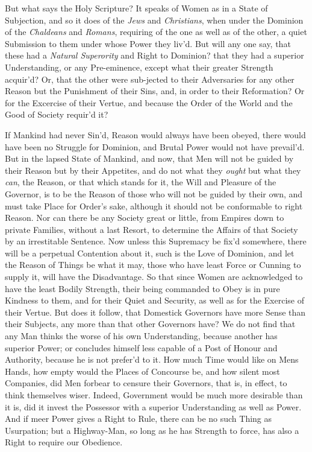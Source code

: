 But what says the Holy Scripture? It speaks of Women as in a State of
Subjection, and so it does of the \textit{Jews} and
\textit{Christians}, when under the Dominion of the \textit{Chaldeans}
and \textit{Romans}, requiring of the one as well as of the other, a
quiet Submission to them under whose Power they liv'd. But will any
one say, that these had a \textit{Natural Superority} and Right to
Dominion? that they had a superior Understanding, or any Pre-eminence,
except what their greater Strength acquir'd? Or, that the other were
sub-jected to their Adversaries for any other Reason but the
Punishment of their Sins, and, in order to their Reformation? Or for
the Excercise of their Vertue, and because the Order of the World and
the Good of Society requir'd it?

If Mankind had never Sin'd, Reason would always have been obeyed,
there would have been no Struggle for Dominion, and Brutal Power would
not have prevail'd. But in the lapsed State of Mankind, and now, that
Men will not be guided by their Reason but by their Appetites, and do
not what they \textit{ought} but what they \textit{can}, the Reason,
or that which stands for it, the Will and Pleasure of the Governor, is
to be the Reason of those who will not be guided by their own, and
must take Place for Order's sake, although it should not be
conformable to right Reason. Nor can there be any Society great or
little, from Empires down to private Families, without a last Resort,
to determine the Affairs of  that Society by an irrestitable
Sentence. Now unless this Supremacy be fix'd somewhere, there will be
a perpetual Contention about it, such is the Love of Dominion, and let
the Reason of Things be what it may, those who have least Force or
Cunning to supply it, will have the Disadvantage. So that since Women
are acknowledged to have the least Bodily Strength, their being
commanded to Obey is in pure Kindness to them, and for their Quiet and
Security, as well as for the Exercise of their Vertue. But does it
follow, that Domestick Governors have more Sense than their Subjects,
any more than that other Governors have? We do not find that any Man
thinks the worse of his own Understanding, because another has
superior Power; or concludes himself less capable of a Post of Honour
and Authority, because he is not prefer'd to it. How much Time would
like on Mens Hands, how empty would the Places of Concourse be, and
how silent most Companies, did  Men forbear to censure their
Governors, that is, in effect, to think themselves wiser. Indeed,
Government would be much more desirable than it is, did it invest the
Possessor with a superior Understanding as well as Power. And if meer
Power gives a Right to Rule, there can be no such Thing as Usurpation;
but a Highway-Man, so long as he has Strength to force, has also a
Right to require our Obedience.

